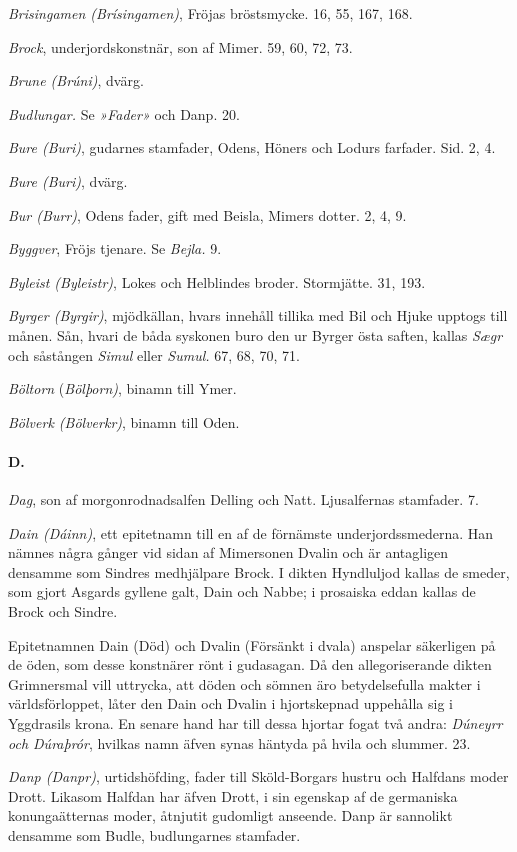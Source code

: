 \emph{Brisingamen (Brísingamen)}, Fröjas bröstsmycke. 16, 55, 167, 168.

\emph{Brock}, underjordskonstnär, son af Mimer. 59, 60, 72, 73.

\emph{Brune (Brúni)}, dvärg.

\emph{Budlungar.} Se \emph{»Fader»} och Danp. 20.

\emph{Bure (Buri)}, gudarnes stamfader, Odens, Höners och Lodurs
farfader. Sid. 2, 4.

\emph{Bure (Buri)}, dvärg.

\emph{Bur (Burr)}, Odens fader, gift med Beisla, Mimers dotter. 2, 4, 9.

\emph{Byggver}, Fröjs tjenare. Se \emph{Bejla.} 9.

\emph{Byleist (Byleistr)}, Lokes och Helblindes broder. Stormjätte. 31,
193.

\emph{Byrger (Byrgir)}, mjödkällan, hvars innehåll tillika med Bil och
Hjuke upptogs till månen. Sån, hvari de båda syskonen buro den ur Byrger
östa saften, kallas \emph{Sægr} och såstången \emph{Simul} eller
\emph{Sumul.} 67, 68, 70, 71.

\emph{Böltorn} (\emph{Bölþorn)}, binamn till Ymer.

\emph{Bölverk (Bölverkr)}, binamn till Oden.

\paragraph{D.}

\emph{Dag}, son af morgonrodnadsalfen Delling och Natt. Ljusalfernas
stamfader. 7.

\emph{Dain (Dáinn)}, ett epitetnamn till en af de förnämste
underjordssmederna. Han nämnes några gånger vid sidan af Mimersonen
Dvalin och är antagligen densamme som Sindres medhjälpare Brock. I
dikten Hyndluljod kallas de smeder, som gjort Asgards gyllene galt, Dain
och Nabbe; i prosaiska eddan kallas de Brock och Sindre.

Epitetnamnen Dain (Död) och Dvalin (Försänkt i dvala) anspelar
säkerligen på de öden, som desse konstnärer rönt i gudasagan. Då den
allegoriserande dikten Grimnersmal vill uttrycka, att döden och sömnen
äro betydelsefulla makter i världsförloppet, låter den Dain och Dvalin i
hjortskepnad uppehålla sig i Yggdrasils krona. En senare hand har till
dessa hjortar fogat två andra: \emph{Dúneyrr och Dúraþrór}, hvilkas namn
äfven synas häntyda på hvila och slummer. 23.

\emph{Danp (Danpr)}, urtidshöfding, fader till Sköld-Borgars hustru och
Halfdans moder Drott. Likasom Halfdan har äfven Drott, i sin egenskap af
de germaniska konungaätternas moder, åtnjutit gudomligt anseende. Danp
är sannolikt densamme som Budle, budlungarnes stamfader.

